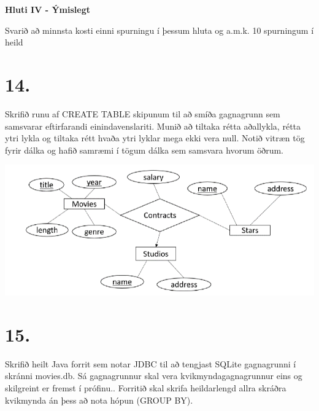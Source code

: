 \documentclass{article}
\newcommand{\bo}[1]{\textbf{#1}}
\begin{document}
\newpage

\begin{center}
    \bo{Hluti IV - Ýmislegt}

    Svarið að minnsta kosti einni spurningu í þessum hluta  og
    a.m.k. 10 spurningum í heild
\end{center}

\section{14.}
Skrifið runu af CREATE TABLE skipunum til að smíða gagnagrunn
sem samsvarar eftirfarandi einindavenslariti. Munið að tiltaka rétta
aðallykla, rétta ytri lykla og tiltaka rétt hvaða ytri lyklar mega ekki
vera null. Notið vitræn tög fyrir dálka og hafið samræmi í tögum
dálka sem samsvara hvorum öðrum.

\begin{center}
    \includegraphics[scale = 0.8]{myndir/mynd1.png}
\end{center}

\vspace{1cm}

\section{15.}
Skrifið heilt Java forrit sem notar JDBC til að tengjast SQLite
gagnagrunni í skránni movies.db. Sá gagnagrunnur skal vera
kvikmyndagagnagrunnur eins og skilgreint er fremst í prófinu..
Forritið skal skrifa heildarlengd allra skráðra kvikmynda án þess að
nota hópun (GROUP BY).
\end{document}
